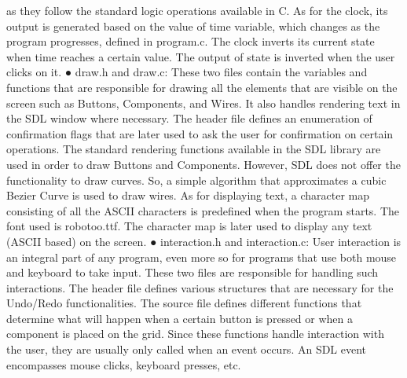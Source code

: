 \documentclass[report]{subfiles}
\begin{document}
as they follow the standard logic operations available in C. As for
the clock, its output is generated based on the value of time
variable, which changes as the program progresses, defined in
program.c. The clock inverts its current state when time reaches a
certain value. The output of state is inverted when the user clicks
on it.
● draw.h and draw.c:
These two files contain the variables and functions that are
responsible for drawing all the elements that are visible on the
screen such as Buttons, Components, and Wires. It also handles
rendering text in the SDL window where necessary. The header
file defines an enumeration of confirmation flags that are later used
to ask the user for confirmation on certain operations.
The standard rendering functions available in the SDL library are
used in order to draw Buttons and Components. However, SDL
does not offer the functionality to draw curves. So, a simple
algorithm that approximates a cubic Bezier Curve is used to draw
wires.
As for displaying text, a character map consisting of all the ASCII
characters is predefined when the program starts. The font used is
robotoo.ttf. The character map is later used to display any text
(ASCII based) on the screen.
● interaction.h and interaction.c:
User interaction is an integral part of any program, even more so
for programs that use both mouse and keyboard to take input.
These two files are responsible for handling such interactions. The
header file defines various structures that are necessary for the
Undo/Redo functionalities.
The source file defines different functions that determine what will
happen when a certain button is pressed or when a component is
placed on the grid. Since these functions handle interaction with
the user, they are usually only called when an event occurs. An
SDL event encompasses mouse clicks, keyboard presses, etc.
\end{document}
